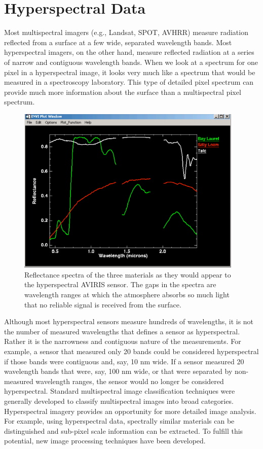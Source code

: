 \documentclass[document.tex]{subfiles}
\begin{document}
\section{Hyperspectral Data}
Most multispectral imagers (e.g., Landsat, SPOT, AVHRR) measure radiation reflected
from a surface at a few wide, separated wavelength bands. Most hyperspectral
imagers, on the other hand, measure reflected radiation at a series of narrow
and contiguous wavelength bands. When we look at a spectrum for one pixel in a
hyperspectral image, it looks very much like a spectrum that would be measured in a
spectroscopy laboratory. This type of detailed pixel spectrum can provide much
more information about the surface than a multispectral pixel spectrum.
\begin{figure}[H]
	\begin{center}
		\includegraphics[height=8.0cm]{imgs/Atmosphere.png}
	\end{center}
	\caption{Reflectance spectra of the three materials as they would appear to the hyperspectral AVIRIS sensor. The gaps in the spectra are wavelength ranges at which the atmosphere absorbs so much light that no reliable signal is received from the surface.}
	\label{fig: Effect of atmospheric absorbtion over hyperspectral data}
\end{figure}
\noindent Although most hyperspectral sensors measure hundreds of wavelengths, it is not the
number of measured wavelengths that defines a sensor as hyperspectral. Rather it is the
narrowness and contiguous nature of the measurements. For example, a sensor that
measured only 20 bands could be considered hyperspectral if those bands were
contiguous and, say, 10 nm wide. If a sensor measured 20 wavelength bands that were,
say, 100 nm wide, or that were separated by non-measured wavelength ranges, the sensor
would no longer be considered hyperspectral.
\noindent Standard multispectral image classification techniques were generally developed to
classify multispectral images into broad categories. Hyperspectral imagery provides an
opportunity for more detailed image analysis. For example, using hyperspectral data,
spectrally similar materials can be distinguished\cite{6} and sub-pixel scale information can be extracted. To fulfill this potential, new image processing techniques have been
developed.
\end{document}
